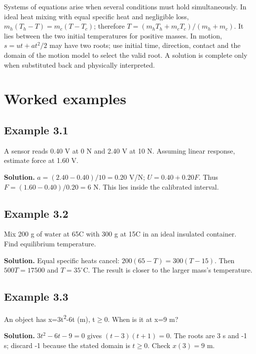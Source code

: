 \documentclass[11pt,a4paper,openany]{book}
\begin{document}
Systems of equations arise when several conditions must hold simultaneously. In ideal heat mixing with equal specific heat and negligible loss, $m_h(T_h-T)=m_c(T-T_c)$; therefore $T=(m_hT_h+m_cT_c)/(m_h+m_c)$. It lies between the two initial temperatures for positive masses. In motion, $s=ut+at^2/2$ may have two roots; use initial time, direction, contact and the domain of the motion model to select the valid root. A solution is complete only when substituted back and physically interpreted.
\begin{center}
\end{center}
\section{Worked examples}
\subsection*{Example 3.1}
A sensor reads 0.40 V at 0 N and 2.40 V at 10 N. Assuming linear response, estimate force at 1.60 V.

\textbf{Solution.} $a=(2.40-0.40)/10=0.20$ V/N; $U=0.40+0.20F$. Thus $F=(1.60-0.40)/0.20=6$ N. This lies inside the calibrated interval.
\subsection*{Example 3.2}
Mix 200 g of water at 65\textdegree{}C with 300 g at 15\textdegree{}C in an ideal insulated container. Find equilibrium temperature.

\textbf{Solution.} Equal specific heats cancel: $200(65-T)=300(T-15)$. Then $500T=17500$ and $T=35^\circ$C. The result is closer to the larger mass's temperature.
\subsection*{Example 3.3}
An object has x=3t\textsuperscript{2}-6t (m), t\ensuremath{\ge}0. When is it at x=9 m?

\textbf{Solution.} $3t^2-6t-9=0$ gives $(t-3)(t+1)=0$. The roots are 3 s and -1 s; discard -1 because the stated domain is $t\ge0$. Check $x(3)=9$ m.
\end{document}
